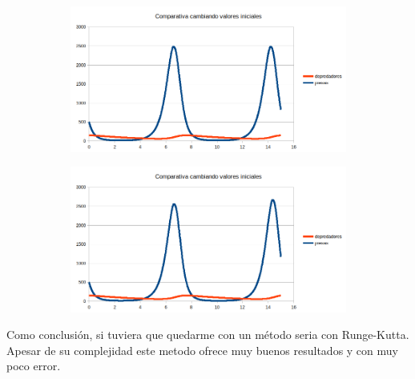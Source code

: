 \documentclass[12pt,a4paper]{article}
\begin{document}
\begin{figure}[H]
	\centering
	\begin{subfigure}{.5\textwidth}
		\centering
	\includegraphics[width=1\linewidth]{images/ejercicio5_4_1}
		\caption{}
	\label{fig:ejercicio541}
	\end{subfigure}%
	\begin{subfigure}{.5\textwidth}
		\centering
	\includegraphics[width=1\linewidth]{images/ejercicio5_4_2}
		\caption{}
	\label{fig:ejercicio542}
	\end{subfigure}
	
	\label{fig:ejercicio54}
\end{figure}

Como conclusión, si tuviera que quedarme con un método seria con Runge-Kutta. Apesar de su complejidad este metodo ofrece muy buenos resultados y con muy poco error. 
\end{document}
